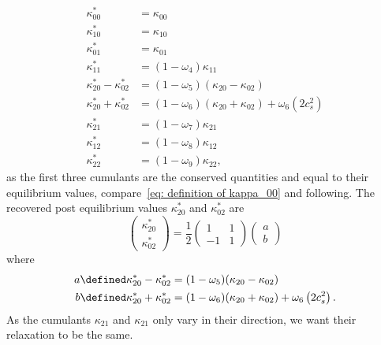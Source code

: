 \begin{equation}
  \label{eq: collision final before simplification}
  \begin{aligned}
    \kappa_{00}^{*} & = \kappa_{00} \\
    \kappa_{10}^{*} & = \kappa_{10} \\
    \kappa_{01}^{*} & = \kappa_{01} \\
    \kappa_{11}^{*} & = (1-\omega_4)\kappa_{11} \\
    \kappa_{20}^{*} - \kappa_{02}^{*}
      & = (1-\omega_5) (\kappa_{20} - \kappa_{02}) \\
    \kappa_{20}^{*} + \kappa_{02}^{*}
      & = (1-\omega_6)(\kappa_{20} + \kappa_{02}) + \omega_6 \left( 2 c_s^2 \right) \\
    \kappa_{21}^{*} & = (1-\omega_7)\kappa_{21} \\
    \kappa_{12}^{*} & = (1-\omega_8)\kappa_{12} \\
    \kappa_{22}^{*} & = (1-\omega_9)\kappa_{22},
  \end{aligned}
\end{equation}
as the first three cumulants are the conserved quantities and equal to their equilibrium values, compare~\eqref{eq: definition of kappa_00} and following.
The recovered post equilibrium values $\kappa_{20}^{*}$ and $\kappa_{02}^{*}$ are
\begin{equation}
  \begin{pmatrix}
    \kappa_{20}^{*} \\
    \kappa_{02}^{*}
  \end{pmatrix}
  = \frac{1}{2}
  \begin{pmatrix}
    1 & 1 \\ -1 & 1
  \end{pmatrix}
  \begin{pmatrix}
    a\\
    b
  \end{pmatrix}
\end{equation}
where
\begin{equation}
 \begin{aligned}
   a \defined \kappa_{20}^{*} - \kappa_{02}^{*}
     & = (1-\omega_5) (\kappa_{20} - \kappa_{02}) \\
   b \defined \kappa_{20}^{*} + \kappa_{02}^{*}
     & = (1-\omega_6)(\kappa_{20} + \kappa_{02}) + \omega_6 \left( 2 c_s^2 \right).
 \end{aligned}
\end{equation}
As the cumulants $\kappa_{21}$ and $\kappa_{21}$ only vary in their direction, we want their relaxation to be the same.
